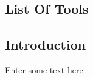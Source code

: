 
\vspace*{8.5cm}

\begin{flushright}
	\section{List Of Tools}
\end{flushright}

\subsection{Introduction}
	Enter some text here